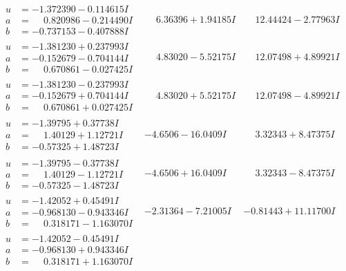 \documentclass[1p]{elsarticle_modified}
\theoremstyle{definition}
\begin{document}
$$\begin{array}{c|c|c}
\begin{aligned}
u &= -1.372390 - 0.114615 I \\
a &= \phantom{-}0.820986 - 0.214490 I \\
b &= -0.737153 - 0.407888 I\end{aligned}
 & \phantom{-}6.36396 + 1.94185 I & \phantom{-}12.44424 - 2.77963 I \\ \hline\begin{aligned}
u &= -1.381230 + 0.237993 I \\
a &= -0.152679 - 0.704144 I \\
b &= \phantom{-}0.670861 - 0.027425 I\end{aligned}
 & \phantom{-}4.83020 - 5.52175 I & \phantom{-}12.07498 + 4.89921 I \\ \hline\begin{aligned}
u &= -1.381230 - 0.237993 I \\
a &= -0.152679 + 0.704144 I \\
b &= \phantom{-}0.670861 + 0.027425 I\end{aligned}
 & \phantom{-}4.83020 + 5.52175 I & \phantom{-}12.07498 - 4.89921 I \\ \hline\begin{aligned}
u &= -1.39795 + 0.37738 I \\
a &= \phantom{-}1.40129 + 1.12721 I \\
b &= -0.57325 + 1.48723 I\end{aligned}
 & -4.6506 - 16.0409 I & \phantom{-}3.32343 + 8.47375 I \\ \hline\begin{aligned}
u &= -1.39795 - 0.37738 I \\
a &= \phantom{-}1.40129 - 1.12721 I \\
b &= -0.57325 - 1.48723 I\end{aligned}
 & -4.6506 + 16.0409 I & \phantom{-}3.32343 - 8.47375 I \\ \hline\begin{aligned}
u &= -1.42052 + 0.45491 I \\
a &= -0.968130 - 0.943346 I \\
b &= \phantom{-}0.318171 - 1.163070 I\end{aligned}
 & -2.31364 - 7.21005 I & -0.81443 + 11.11700 I \\ \hline\begin{aligned}
u &= -1.42052 - 0.45491 I \\
a &= -0.968130 + 0.943346 I \\
b &= \phantom{-}0.318171 + 1.163070 I\end{aligned}

\end{array}$$
\end{document}
